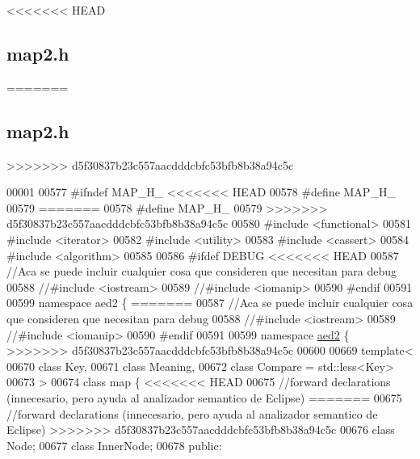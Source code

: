 <<<<<<< HEAD
\hypertarget{map2_8h_source}{\subsection{map2.\-h}
}
=======
\hypertarget{map2_8h_source}{}\subsection{map2.\+h}
>>>>>>> d5f30837b23c557aacdddcbfc53bfb8b38a94c5c

\begin{DoxyCode}
00001 
00577 \textcolor{preprocessor}{#ifndef MAP\_H\_}
<<<<<<< HEAD
00578 \textcolor{preprocessor}{}\textcolor{preprocessor}{#define MAP\_H\_}
00579 \textcolor{preprocessor}{}
=======
00578 \textcolor{preprocessor}{#define MAP\_H\_}
00579 
>>>>>>> d5f30837b23c557aacdddcbfc53bfb8b38a94c5c
00580 \textcolor{preprocessor}{#include <functional>}
00581 \textcolor{preprocessor}{#include <iterator>}
00582 \textcolor{preprocessor}{#include <utility>}
00583 \textcolor{preprocessor}{#include <cassert>}
00584 \textcolor{preprocessor}{#include <algorithm>}
00585 
00586 \textcolor{preprocessor}{#ifdef DEBUG}
<<<<<<< HEAD
00587 \textcolor{preprocessor}{}\textcolor{comment}{//Aca se puede incluir cualquier cosa que consideren que necesitan para debug}
00588 \textcolor{comment}{//#include <iostream>}
00589 \textcolor{comment}{//#include <iomanip>}
00590 \textcolor{preprocessor}{#endif}
00591 \textcolor{preprocessor}{}
00599 \textcolor{keyword}{namespace }aed2 \{
=======
00587 \textcolor{comment}{//Aca se puede incluir cualquier cosa que consideren que necesitan para debug}
00588 \textcolor{comment}{//#include <iostream>}
00589 \textcolor{comment}{//#include <iomanip>}
00590 \textcolor{preprocessor}{#endif}
00591 
00599 \textcolor{keyword}{namespace }\hyperlink{namespaceaed2}{aed2} \{
>>>>>>> d5f30837b23c557aacdddcbfc53bfb8b38a94c5c
00600 
00669 \textcolor{keyword}{template}<
00670   \textcolor{keyword}{class }Key,
00671   \textcolor{keyword}{class }Meaning,
00672   \textcolor{keyword}{class }Compare = std::less<Key>
00673 >
00674 \textcolor{keyword}{class }map \{
<<<<<<< HEAD
00675     \textcolor{comment}{//forward declarations (innecesario, pero ayuda al analizador semantico de
       Eclipse)}
=======
00675     \textcolor{comment}{//forward declarations (innecesario, pero ayuda al analizador semantico de Eclipse)}
>>>>>>> d5f30837b23c557aacdddcbfc53bfb8b38a94c5c
00676     \textcolor{keyword}{class }Node;
00677     \textcolor{keyword}{class }InnerNode;
00678 \textcolor{keyword}{public}:

\end{DoxyCode}
